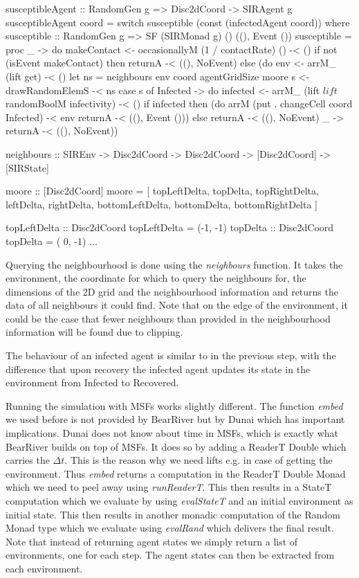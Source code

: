 \begin{HaskellCode}
susceptibleAgent :: RandomGen g => Disc2dCoord -> SIRAgent g
susceptibleAgent coord
    = switch susceptible (const (infectedAgent coord))
  where
    susceptible :: RandomGen g 
      => SF (SIRMonad g) () ((), Event ())
    susceptible = proc _ -> do
      makeContact <- occasionallyM (1 / contactRate) () -< ()
      if not (isEvent makeContact)
        then returnA -< ((), NoEvent)
        else (do
          env <- arrM_ (lift get) -< ()
          let ns = neighbours env coord agentGridSize moore
          s <- drawRandomElemS -< ns
          case s of
            Infected -> do
              infected <- arrM_ 
                (lift $ lift $ randomBoolM infectivity) -< ()
              if infected 
                then (do
                  arrM (put . changeCell coord Infected) -< env
                  returnA -< ((), Event ()))
                else returnA -< ((), NoEvent)
            _        -> returnA -< ((), NoEvent))

neighbours :: SIREnv -> Disc2dCoord -> Disc2dCoord 
           -> [Disc2dCoord] -> [SIRState]
           
moore :: [Disc2dCoord]
moore = [ topLeftDelta,    topDelta,     topRightDelta,
          leftDelta,                     rightDelta,
          bottomLeftDelta, bottomDelta,  bottomRightDelta ]

topLeftDelta :: Disc2dCoord
topLeftDelta      = (-1, -1)
topDelta :: Disc2dCoord
topDelta          = ( 0, -1)
...
\end{HaskellCode}
Querying the neighbourhood is done using the \textit{neighbours} function. It takes the environment, the coordinate for which to query the neighbours for, the dimensions of the 2D grid and the neighbourhood information and returns the data of all neighbours it could find. Note that on the edge of the environment, it could be the case that fewer neighbours than provided in the neighbourhood information will be found due to clipping.

The behaviour of an infected agent is similar to in the previous step, with the difference that upon recovery the infected agent updates its state in the environment from Infected to Recovered.

Running the simulation with MSFs works slightly different. The function \textit{embed} we used before is not provided by BearRiver but by Dunai which has important implications. Dunai does not know about time in MSFs, which is exactly what BearRiver builds on top of MSFs. It does so by adding a ReaderT Double which carries the $\Delta t$. This is the reason why we need lifts e.g. in case of getting the environment. Thus \textit{embed} returns a computation in the ReaderT Double Monad which we need to peel away using \textit{runReaderT}. This then results in a StateT computation which we evaluate by using \textit{evalStateT} and an initial environment as initial state. This then results in another monadic computation of the Random Monad type which we evaluate using \textit{evalRand} which delivers the final result. Note that instead of returning agent states we simply return a list of environments, one for each step. The agent states can then be extracted from each environment.

